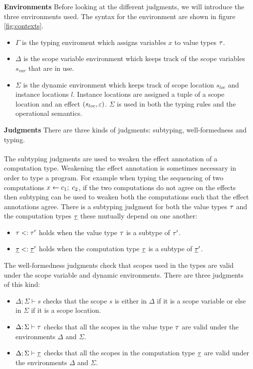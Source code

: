 {\textbf{Environments}
Before looking at the different judgments, we will introduce the three environments used.
The syntax for the environment are shown in figure \ref{fig:contexts}.
\begin{itemize}
\item $\Gamma$ is the typing enviroment which assigns variables $x$ to value types $\tau$.
\item $\Delta$ is the scope variable environment which keeps track of the scope variables $s_{var}$ that are in use.
\item $\Sigma$ is the dynamic environment which keeps track of scope location $s_{loc}$ and instance locations $l$. Instance locations are assigned a tuple of a scope location and an effect $(s_{loc}, \varepsilon)$. $\Sigma$ is used in both the typing rules and the operational semantics.
\end{itemize}

\textbf{Judgments}
There are three kinds of judgments: subtyping, well-formedness and typing.
\\\\
The subtyping judgments are used to weaken the effect annotation of a computation type.
Weakening the effect annotation is sometimes necessary in order to type a program.
For example when typing the sequencing of two computations $x \leftarrow c_1 ;\; c_2$, if the two computations do not agree on the effects then subtyping can be used to weaken both the computations such that the effect annotations agree.
There is a subtyping judgment for both the value types $\tau$ and the computation types $\underline{\tau}$ these mutually depend on one another:
\begin{itemize}
\setlength\itemsep{0.5em}
\item $\tau <: \tau'$ holds when the value type $\tau$ is a subtype of $\tau'$.
\item $\underline{\tau} <: \underline{\tau}'$ holds when the computation type $\underline{\tau}$ is a subtype of $\underline{\tau}'$.
\end{itemize}

The well-formedness judgments check that scopes used in the types are valid under the scope variable and dynamic environments.
There are three judgments of this kind:
\begin{itemize}
\setlength\itemsep{0.5em}
\item $\Delta;\Sigma \vdash s$ checks that the scope $s$ is either in $\Delta$ if it is a scope variable or else in $\Sigma$ if it is a scope location.
\item $\Delta;\Sigma \vdash \tau$ checks that all the scopes in the value type $\tau$ are valid under the environments $\Delta$ and $\Sigma$.
\item $\Delta;\Sigma \vdash \underline{\tau}$ checks that all the scopes in the computation type $\underline{\tau}$ are valid under the environments $\Delta$ and $\Sigma$.
\end{itemize}

}
